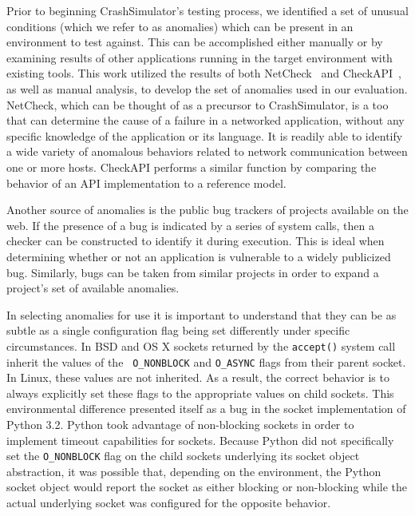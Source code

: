     Prior to beginning CrashSimulator's testing
    process, we identified a set of unusual conditions (which we refer to as anomalies)
    which can be present in an environment to test against.
    This can be accomplished either manually or by
    examining results of other applications running in the target environment with existing
    tools.  This work utilized the results of both
    NetCheck~\cite{Zhuang_NSDI_2014} and CheckAPI~\cite{rasley2015detecting}, as
    well as manual analysis, to develop the set of anomalies used in our
    evaluation.  NetCheck, which can be thought of as a precursor to
    CrashSimulator, is a too that can determine the cause of a failure in a
    networked application, without any specific knowledge of the application or
    its language. It is readily able to identify a wide variety of anomalous
    behaviors related to network communication between one or more
    hosts.  CheckAPI performs a similar function by comparing the behavior of an API
    implementation to a reference model.

    Another source of anomalies is the public bug trackers of projects available
    on the web.  If the presence of a bug is indicated by a series of system
    calls, then a checker can be constructed to identify it during execution. This
    is ideal when determining whether or not an application is vulnerable to a
    widely publicized bug.  Similarly, bugs can be taken from similar projects
    in order to expand a project's set of available anomalies.

    In selecting anomalies for use it is important to understand that they
    can be as subtle as a single configuration flag being set
    differently under specific circumstances.  In BSD and OS X sockets returned
    by the {\tt accept()} system call inherit the values of the {\tt
      O\_NONBLOCK} and {\tt O\_ASYNC} flags from their parent socket.  In Linux,
    these values are not inherited.  As a result, the correct behavior is to
    always explicitly set these flags to the appropriate values on child
    sockets.  This environmental difference presented itself as a bug
    in the socket implementation of Python 3.2.  Python took advantage of
    non-blocking sockets in order to implement timeout capabilities for sockets.
    Because Python did not specifically set the {\tt O\_NONBLOCK} flag on the
    child sockets underlying its socket object abstraction, it was possible that,
    depending on the environment, the Python socket object would report the
    socket as either blocking or non-blocking while the actual underlying socket
    was configured for the opposite behavior.

